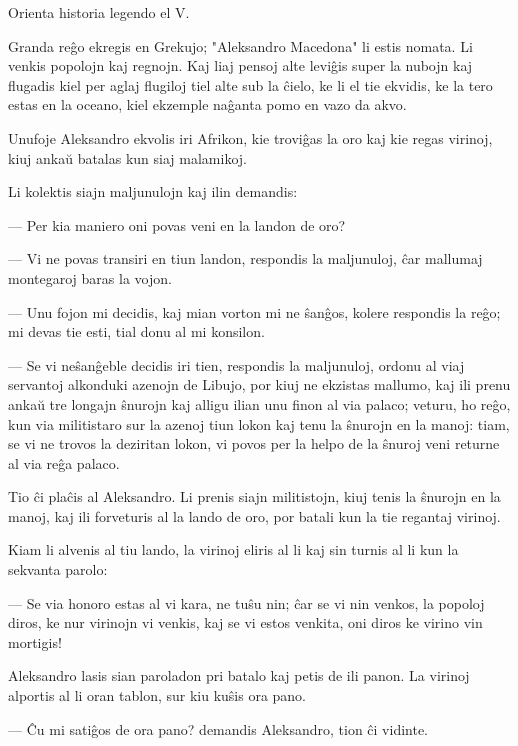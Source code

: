 \begin{center}
\footnotesize Orienta historia legendo el V. 
\end{center}

   Granda re\^go ekregis en Grekujo; "Aleksandro Macedona" li estis
nomata. Li venkis popolojn kaj regnojn. Kaj liaj pensoj alte
levi\^gis super la nubojn kaj flugadis kiel per aglaj flugiloj tiel
alte sub la \^cielo, ke li el tie ekvidis, ke la tero estas en la
oceano, kiel ekzemple na\^ganta pomo en vazo da akvo.

   Unufoje Aleksandro ekvolis iri Afrikon, kie trovi\^gas la oro kaj kie
regas virinoj, kiuj anka\u u batalas kun siaj malamikoj.

   Li kolektis siajn maljunulojn kaj ilin demandis:

 --- Per kia maniero oni povas veni en la landon de oro?

 --- Vi ne povas transiri en tiun landon, respondis la maljunuloj, \^car
mallumaj montegaroj baras la vojon.

 --- Unu fojon mi decidis, kaj mian vorton mi ne \^san\^gos, kolere
respondis la re\^go; mi devas tie esti, tial donu al mi konsilon.

 --- Se vi ne\^san\^geble decidis iri tien, respondis la maljunuloj,
ordonu al viaj servantoj alkonduki azenojn de Libujo, por kiuj ne
ekzistas mallumo, kaj ili prenu anka\u u tre longajn \^snurojn kaj
alligu ilian unu finon al via palaco; veturu, ho re\^go, kun via
militistaro sur la azenoj tiun lokon kaj tenu la \^snurojn en la
manoj: tiam, se vi ne trovos la deziritan lokon, vi povos per la
helpo de la \^snuroj veni returne al via re\^ga palaco.

   Tio \^ci pla\^cis al Aleksandro. Li prenis siajn militistojn, kiuj
tenis la \^snurojn en la manoj, kaj ili forveturis al la lando de
oro, por batali kun la tie regantaj virinoj.

   Kiam li alvenis al tiu lando, la virinoj eliris al li kaj sin turnis
al li kun la sekvanta parolo:

 --- Se via honoro estas al vi kara, ne tu\^su nin; \^car se vi nin
venkos, la popoloj diros, ke nur virinojn vi venkis, kaj se vi estos
venkita, oni diros ke virino vin mortigis!

   Aleksandro lasis sian paroladon pri batalo kaj petis de ili panon. La
virinoj alportis al li oran tablon, sur kiu ku\^sis ora pano.

 --- \^Cu mi sati\^gos de ora pano? demandis Aleksandro, tion \^ci
vidinte.

